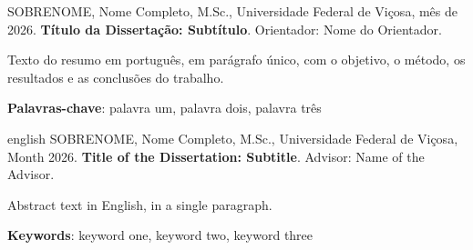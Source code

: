 
\begin{resumo}[Resumo]
    \SingleSpacing
    SOBRENOME, Nome Completo, M.Sc., Universidade Federal de Viçosa, mês de 2026.
    \textbf{Título da Dissertação: Subtítulo}. Orientador: Nome do Orientador.

    \vspace{\onelineskip}
    \noindent Texto do resumo em português, em parágrafo único, com o objetivo, o método,
    os resultados e as conclusões do trabalho.

    \vspace{\onelineskip}
    \noindent\textbf{Palavras-chave}: palavra um, palavra dois, palavra três
\end{resumo}

\begin{resumo}[Abstract]
    \begin{otherlanguage*}{english}
        \SingleSpacing
        SOBRENOME, Nome Completo, M.Sc., Universidade Federal de Viçosa, Month 2026.
        \textbf{Title of the Dissertation: Subtitle}. Advisor: Name of the Advisor.

        \vspace{\onelineskip}
        \noindent Abstract text in English, in a single paragraph.

        \vspace{\onelineskip}
        \noindent\textbf{Keywords}: keyword one, keyword two, keyword three
    \end{otherlanguage*}
\end{resumo}
